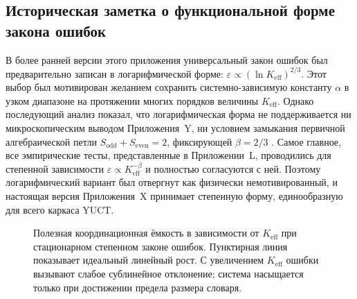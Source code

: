 \documentclass[12pt,a4paper]{article}
\theoremstyle{remark}
\begin{document}
	\subsection*{Историческая заметка о функциональной форме закона ошибок}
	
	В более ранней версии этого приложения универсальный закон ошибок был предварительно записан в логарифмической форме: \( \varepsilon \propto (\ln K_{\mathrm{eff}})^{2/3} \). Этот выбор был мотивирован желанием сохранить системно-зависимую константу \(\alpha\) в узком диапазоне на протяжении многих порядков величины \(K_{\mathrm{eff}}\). Однако последующий анализ показал, что логарифмическая форма не поддерживается ни микроскопическим выводом Приложения~Y, ни условием замыкания первичной алгебраической петли \(S_{\mathrm{odd}}+S_{\mathrm{even}}=2\), фиксирующей \(\beta=2/3\) \cite{YakushevLaw2026}. Самое главное, все эмпирические тесты, представленные в Приложении~L, проводились для степенной зависимости \(\varepsilon \propto K_{\mathrm{eff}}^{-\beta}\) и полностью согласуются с ней. Поэтому логарифмический вариант был отвергнут как физически немотивированный, и настоящая версия Приложения~X принимает степенную форму, единообразную для всего каркаса YUCT.
	
	\begin{figure}[htbp]
		\centering
		\caption{Полезная координационная ёмкость в зависимости от \(K_{\mathrm{eff}}\) при стационарном степенном законе ошибок. Пунктирная линия показывает идеальный линейный рост. С увеличением \(K_{\mathrm{eff}}\) ошибки вызывают слабое сублинейное отклонение; система насыщается только при достижении предела размера словаря.}
		\label{fig:keff-phase}
	\end{figure}
	
\end{document}
